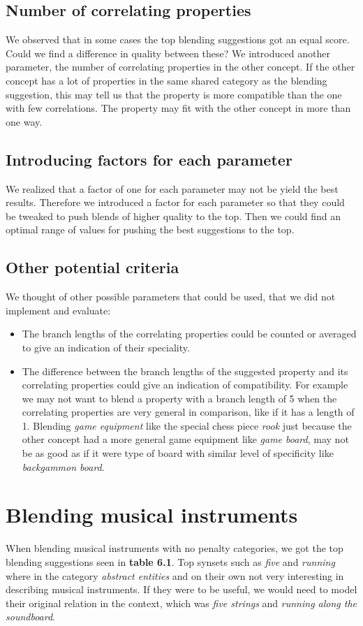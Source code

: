 \subsection{Number of correlating properties}
We observed that in some cases the top blending suggestions got an equal score. Could we find a difference in quality between these? We introduced another parameter, the number of correlating properties in the other concept. If the other concept has a lot of properties in the same shared category as the blending suggestion, this may tell us that the property is more compatible than the one with few correlations. The property may fit with the other concept in more than one way.

\subsection{Introducing factors for each parameter}
We realized that a factor of one for each parameter may not be yield the best results. Therefore we introduced a factor for each parameter so that they could be tweaked to push blends of higher quality to the top. Then we could find an optimal range of values for pushing the best suggestions to the top.

\subsection{Other potential criteria}
We thought of other possible parameters that could be used, that we did not implement and evaluate:
\begin{itemize}
\item The branch lengths of the correlating properties could be counted or averaged to give an indication of their speciality.
\item The difference between the branch lengths of the suggested property and its correlating properties could give an indication of compatibility. For example we may not want to blend a property with a branch length of 5 when the correlating properties are very general in comparison, like if it has a length of 1. Blending \emph{game equipment} like the special chess piece \emph{rook} just because the other concept had a more general game equipment like \emph{game board}, may not be as good as if it were type of board with similar level of specificity like \emph{backgammon board}.
\end{itemize}

\section{Blending musical instruments}
When blending musical instruments with no penalty categories, we got the top blending suggestions seen in \textbf{table 6.1}. Top synsets such as \emph{five} and \emph{running} where in the category \emph{abstract entities} and on their own not very interesting in describing musical instruments. If they were to be useful, we would need to model their original relation in the context, which was \emph{five strings} and \emph{running along the soundboard}.

